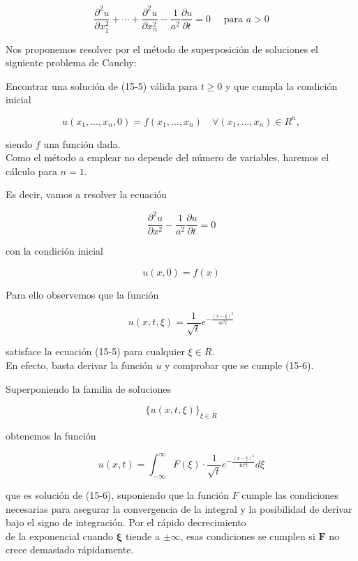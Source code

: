 \documentclass[10pt]{article}
\theoremstyle{plain}
\theoremstyle{definition}
\theoremstyle{remark}
\begin{document}
\begin{equation*}
\frac{\partial^{2} u}{\partial x_{1}^{2}}+\cdots+\frac{\partial^{2} u}{\partial x_{n}^{2}}-\frac{1}{a^{2}} \frac{\partial u}{\partial t}=0 \quad \text { para } a>0 \tag{15-5}
\end{equation*}


Nos proponemos resolver por el método de superposición de soluciones el siguiente problema de Cauchy:

Encontrar una solución de (15-5) válida para $t \geqslant 0$ y que cumpla la condición inicial

$$
u\left(x_{1}, \ldots, x_{n}, 0\right)=f\left(x_{1}, \ldots, x_{n}\right) \quad \forall\left(x_{1}, \ldots, x_{n}\right) \in R^{n},
$$

siendo $f$ una función dada.\\
Como el método a emplear no depende del número de variables, haremos el cálculo para $n=1$.

Es decir, vamos a resolver la ecuación


\begin{equation*}
\frac{\partial^{2} u}{\partial x^{2}}-\frac{1}{a^{2}} \frac{\partial u}{\partial t}=0 \tag{$15\cdot6$}
\end{equation*}


con la condición inicial

$$
u(x, 0)=f(x)
$$

Para ello observemos que la función


\begin{equation*}
u(x, t, \xi)=\frac{1}{\sqrt{t}} e^{-\frac{(x-\xi)^{2}}{4 a^{2} t}} \tag{15-7}
\end{equation*}


satisface la ecuación (15-5) para cualquier $\xi \in R$.\\
En efecto, basta derivar la función $u$ y comprobar que se cumple (15-6).

Superponiendo la familia de soluciones

$$
\{u(x, t, \xi)\}_{\xi \in R}
$$

obtenemos la función


\begin{equation*}
u(x, t)=\int_{-\infty}^{\infty} F(\xi) \cdot \frac{1}{\sqrt{t}} e^{-\frac{(x-\xi)^{2}}{4 a^{2} t}} d \xi \tag{15-8}
\end{equation*}


que es solución de (15-6), suponiendo que la función $F$ cumple las condiciones necesarias para asegurar la convergencia de la integral y la posibilidad de derivar bajo el signo de integración. Por el rápido decrecimiento\\
de la exponencial cuando $\boldsymbol{\xi}$ tiende a $\pm \infty$, esas condiciones se cumplen si $\boldsymbol{F}$ no crece demasiado rápidamente.
\end{document}
